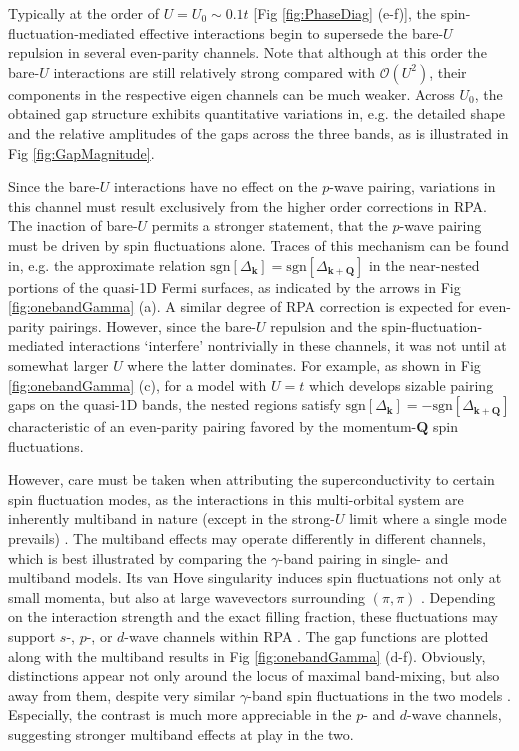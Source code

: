 \documentclass[aps,prl,twocolumn,superscriptaddress,showpacs]{revtex4-1}
\newcommand{\bs}{\boldsymbol}
\begin{document}
Typically at the order of $U =U_0\sim 0.1t$ [Fig \ref{fig:PhaseDiag} (e-f)], the spin-fluctuation-mediated effective interactions begin to supersede the bare-$U$ repulsion in several even-parity channels. Note that although at this order the bare-$U$ interactions are still relatively strong compared with $\mathcal{O}(U^2)$, their components in the respective eigen channels can be much weaker. Across $U_0$, the obtained gap structure exhibits quantitative variations in, e.g. the detailed shape and the relative amplitudes of the gaps across the three bands, as is illustrated in Fig \ref{fig:GapMagnitude}.

Since the bare-$U$ interactions have no effect on the $p$-wave pairing, variations in this channel must result exclusively from the higher order corrections in RPA. The inaction of bare-$U$ permits a stronger statement, that the $p$-wave pairing must be driven by spin fluctuations alone. Traces of this mechanism \cite{Tsuchiizu:15,Scaffidi:15} can be found in, e.g. the approximate relation $\text{sgn}[\Delta_{\bs k}] = \text{sgn}[\Delta_{\bs k+\bs Q}]$ in the near-nested portions of the quasi-1D Fermi surfaces, as indicated by the arrows in Fig \ref{fig:onebandGamma} (a). A similar degree of RPA correction is expected for even-parity pairings. However, since the bare-$U$ repulsion and the spin-fluctuation-mediated interactions `interfere' nontrivially in these channels, it was not until at somewhat larger $U$ where the latter dominates. For example, as shown in Fig \ref{fig:onebandGamma} (c), for a model with $U=t$ which develops sizable pairing gaps on the quasi-1D bands, the nested regions satisfy $\text{sgn}[\Delta_{\bs k}] = -\text{sgn}[\Delta_{\bs k+\bs Q}]$ characteristic of an even-parity pairing favored by the momentum-${\bs Q}$ spin fluctuations.

However, care must be taken when attributing the superconductivity to certain spin fluctuation modes, as the interactions in this multi-orbital system are inherently multiband in nature (except in the strong-$U$ limit where a single mode prevails) \cite{Huang:16}. The multiband effects may operate differently in different channels, which is best illustrated by comparing the $\gamma$-band pairing in single- and multiband models. Its van Hove singularity induces spin fluctuations not only at small momenta, but also at large wavevectors surrounding $(\pi,\pi)$ \cite{Liu:17}. Depending on the interaction strength and the exact filling fraction, these fluctuations may support $s$-, $p$-, or $d$-wave channels within RPA \cite{seeSupp}. The gap functions are plotted along with the multiband results in Fig \ref{fig:onebandGamma} (d-f). Obviously, distinctions appear not only around the locus of maximal band-mixing, but also away from them, despite very similar $\gamma$-band spin fluctuations in the two models \cite{seeSupp}. Especially, the contrast is much more appreciable in the $p$- and $d$-wave channels, suggesting stronger multiband effects at play in the two.
\end{document}
